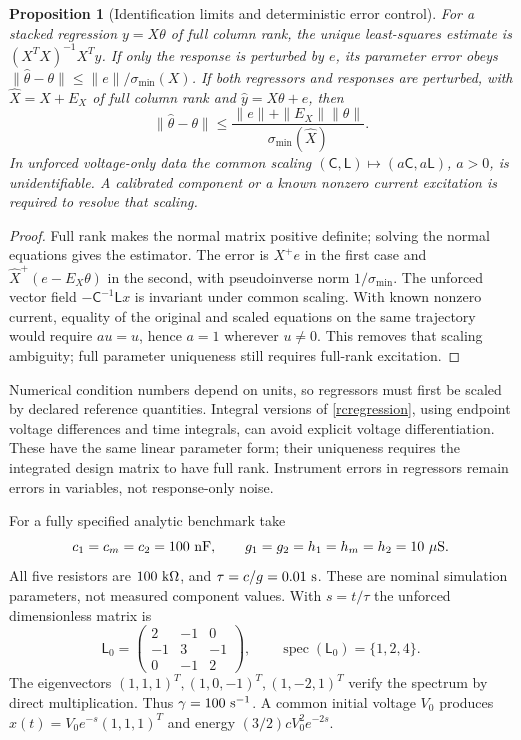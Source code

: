 \documentclass[11pt,letterpaper]{article}
\newcommand{\spec}{\operatorname{spec}}
\newtheorem{proposition}[theorem]{Proposition}
\theoremstyle{definition}
\numberwithin{equation}{section}
\begin{document}
\begin{proposition}[Identification limits and deterministic error control]\label{rcidentify}
For a stacked regression $y=X\theta$ of full column rank, the unique least-squares estimate is $(X^TX)^{-1}X^Ty$. If only the response is perturbed by $e$, its parameter error obeys $\|\widehat\theta-\theta\|\leq\|e\|/\sigma_{\min}(X)$. If both regressors and responses are perturbed, with $\widehat X=X+E_X$ of full column rank and $\widehat y=X\theta+e$, then
\begin{equation}\label{rciderror}
\|\widehat\theta-\theta\|\leq\frac{\|e\|+\|E_X\|\|\theta\|}{\sigma_{\min}(\widehat X)}.
\end{equation}
In unforced voltage-only data the common scaling $(\mathsf C,\mathsf L)\mapsto(a\mathsf C,a\mathsf L)$, $a>0$, is unidentifiable. A calibrated component or a known nonzero current excitation is required to resolve that scaling.
\end{proposition}
\begin{proof}
Full rank makes the normal matrix positive definite; solving the normal equations gives the estimator. The error is $X^+e$ in the first case and $\widehat X^+(e-E_X\theta)$ in the second, with pseudoinverse norm $1/\sigma_{\min}$. The unforced vector field $-\mathsf C^{-1}\mathsf Lx$ is invariant under common scaling. With known nonzero current, equality of the original and scaled equations on the same trajectory would require $a u=u$, hence $a=1$ wherever $u\ne0$. This removes that scaling ambiguity; full parameter uniqueness still requires full-rank excitation.
\end{proof}
Numerical condition numbers depend on units, so regressors must first be scaled by declared reference quantities. Integral versions of \eqref{rcregression}, using endpoint voltage differences and time integrals, can avoid explicit voltage differentiation. These have the same linear parameter form; their uniqueness requires the integrated design matrix to have full rank. Instrument errors in regressors remain errors in variables, not response-only noise.

For a fully specified analytic benchmark take
\begin{equation}\label{rcbenchmark}
c_1=c_m=c_2=100\ {\rm nF},\qquad
 g_1=g_2=h_1=h_m=h_2=10\ {\rm \mu S}.
\end{equation}
All five resistors are $100\ {\rm k\Omega}$, and $\tau=c/g=0.01\ {\rm s}$. These are nominal simulation parameters, not measured component values. With $s=t/\tau$ the unforced dimensionless matrix is
\begin{equation}\label{rcbenchmarkmatrix}
\mathsf L_0=\begin{pmatrix}2&-1&0\\-1&3&-1\\0&-1&2\end{pmatrix},\qquad
\spec(\mathsf L_0)=\{1,2,4\}.
\end{equation}
The eigenvectors $(1,1,1)^T,(1,0,-1)^T,(1,-2,1)^T$ verify the spectrum by direct multiplication. Thus $\gamma=100\ {\rm s}^{-1}$. A common initial voltage $V_0$ produces $x(t)=V_0e^{-s}(1,1,1)^T$ and energy $(3/2)cV_0^2e^{-2s}$.
\end{document}

